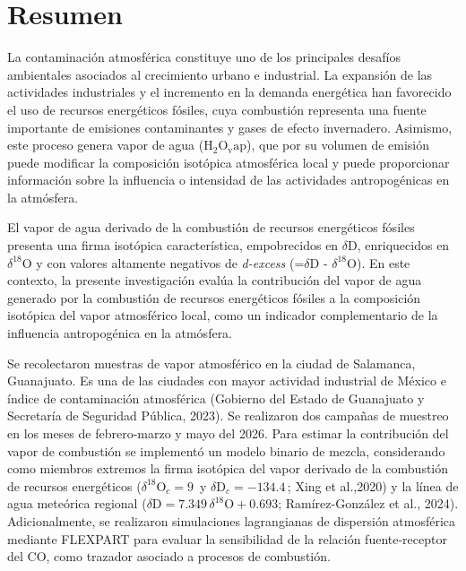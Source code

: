 \chapter*{Resumen}

La contaminación atmosférica constituye uno de los principales desafíos 
ambientales asociados al crecimiento urbano e industrial. La expansión 
de las actividades industriales y el incremento en la demanda energética 
han favorecido el uso de recursos energéticos fósiles, cuya combustión representa 
una fuente importante de emisiones contaminantes y gases de efecto invernadero. 
Asimismo, este proceso genera vapor de agua ($\mathrm{H_2O_vap}$), que
por su volumen de emisión puede modificar la composición isotópica 
atmosférica local y puede proporcionar información sobre la 
influencia o intensidad de las actividades antropogénicas en la atmósfera.

El vapor de agua derivado de la combustión de recursos energéticos fósiles presenta 
una firma isotópica característica, 
empobrecidos en $\delta\mathrm{D}$, enriquecidos en $\delta^{18}\mathrm{O}$ y con
valores altamente negativos de \textit{d-excess} (=$\delta\mathrm{D}$ - $\delta^{18}\mathrm{O}$). 
En este contexto, la presente 
investigación evalúa la contribución del vapor de agua generado por la 
combustión de recursos energéticos fósiles a la composición isotópica del vapor 
atmosférico local, como un indicador complementario de la influencia 
antropogénica en la atmósfera.

Se recolectaron muestras de vapor atmosférico en la ciudad de Salamanca, Guanajuato. Es
una de las ciudades con mayor actividad industrial de México e índice de contaminación 
atmosférica (Gobierno del Estado de Guanajuato y Secretaría de Seguridad Pública,
2023). Se realizaron 
dos campañas de muestreo en los meses de febrero-marzo y mayo del 2026. Para estimar la contribución 
del vapor de combustión se implementó un modelo binario de mezcla, 
considerando como miembros extremos la firma isotópica del vapor derivado 
de la combustión de recursos energéticos ($\delta^{18}\mathrm{O}_c = 9$\,\textperthousand{} 
y $\delta\mathrm{D}_c = -134.4$\,\textperthousand{}; Xing et al.,2020) y la línea de agua 
meteórica regional ($\delta\mathrm{D} = 7.349\,\delta^{18}\mathrm{O} + 0.693$; Ramírez-González et al., 2024). 
Adicionalmente, se realizaron simulaciones lagrangianas de dispersión 
atmosférica mediante FLEXPART para evaluar la sensibilidad de la relación 
fuente-receptor del CO, como trazador asociado a procesos de combustión.

